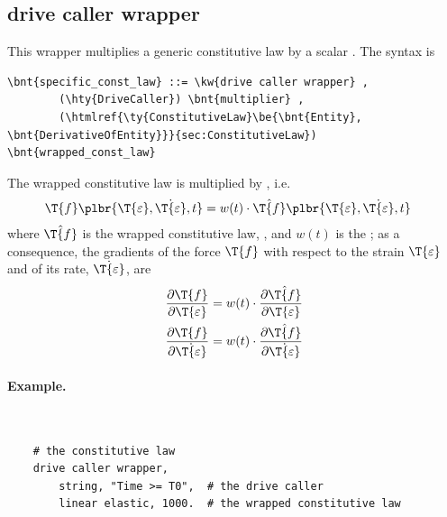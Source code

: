 \subsection{drive caller wrapper}
This wrapper multiplies a generic constitutive law by a scalar .
The syntax is
\begin{Verbatim}[commandchars=\\\{\}]
    \bnt{specific_const_law} ::= \kw{drive caller wrapper} ,
        (\hty{DriveCaller}) \bnt{multiplier} ,
        (\htmlref{\ty{ConstitutiveLaw}\be{\bnt{Entity}, \bnt{DerivativeOfEntity}}}{sec:ConstitutiveLaw}) \bnt{wrapped_const_law}
\end{Verbatim}
The wrapped constitutive law  is multiplied by , i.e.\
\begin{align}
	\T{f}\plbr{\T{\varepsilon}, \dot{\T{\varepsilon}}, t} &= w(t) \cdot \hat{\T{f}}\plbr{\T{\varepsilon}, \dot{\T{\varepsilon}}, t}
\end{align}
where $\hat{\T{f}}$ is the wrapped constitutive law, , and $w(t)$ is the  ;
as a consequence, the gradients of the force $\T{f}$ with respect to the strain $\T{\varepsilon}$ and of its rate, $\dot{\T{\varepsilon}}$,
are
\begin{subequations}
\begin{align}
	\frac{\partial \T{f}}{\partial\T{\varepsilon}} &= w(t) \cdot \frac{\partial \hat{\T{f}}}{\partial\T{\varepsilon}}
	\\
	\frac{\partial \T{f}}{\partial\dot{\T{\varepsilon}}} &= w(t) \cdot \frac{\partial \hat{\T{f}}}{\partial\dot{\T{\varepsilon}}}
\end{align}
\end{subequations}

\paragraph{Example.} \
\begin{verbatim}
    # the constitutive law
    drive caller wrapper,
        string, "Time >= T0",  # the drive caller
        linear elastic, 1000.  # the wrapped constitutive law
\end{verbatim}


